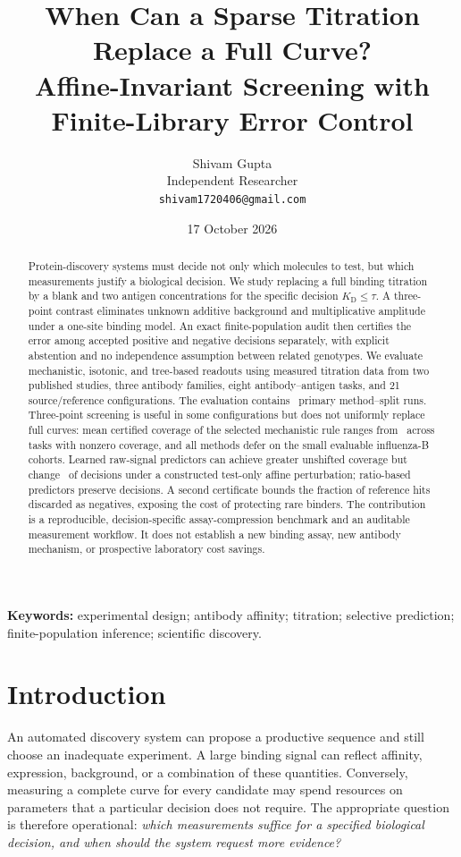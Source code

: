 \documentclass[11pt,letterpaper]{article}
\title{When Can a Sparse Titration Replace a Full Curve?\\[4pt]\large Affine-Invariant Screening with Finite-Library Error Control}
\author{Shivam Gupta\\\small Independent Researcher\\\small\texttt{shivam1720406@gmail.com}}
\date{17 October 2026}
\newcommand{\KD}{K_{\mathrm D}}
\begin{document}
\maketitle
\begin{abstract}
Protein-discovery systems must decide not only which molecules to test, but which measurements justify a biological decision. We study replacing a full binding titration by a blank and two antigen concentrations for the specific decision $\KD\leq\tau$. A three-point contrast eliminates unknown additive background and multiplicative amplitude under a one-site binding model. An exact finite-population audit then certifies the error among accepted positive and negative decisions separately, with explicit abstention and no independence assumption between related genotypes. We evaluate mechanistic, isotonic, and tree-based readouts using measured titration data from two published studies, three antibody families, eight antibody--antigen tasks, and 21 source/reference configurations. The evaluation contains \PrimaryRuns\ primary method--split runs. Three-point screening is useful in some configurations but does not uniformly replace full curves: mean certified coverage of the selected mechanistic rule ranges from \ContrastCoverageRange\ across tasks with nonzero coverage, and all methods defer on the small evaluable influenza-B cohorts. Learned raw-signal predictors can achieve greater unshifted coverage but change \RawFlipRange\ of decisions under a constructed test-only affine perturbation; ratio-based predictors preserve decisions. A second certificate bounds the fraction of reference hits discarded as negatives, exposing the cost of protecting rare binders. The contribution is a reproducible, decision-specific assay-compression benchmark and an auditable measurement workflow. It does not establish a new binding assay, new antibody mechanism, or prospective laboratory cost savings.
\end{abstract}
\noindent\textbf{Keywords:} experimental design; antibody affinity; titration; selective prediction; finite-population inference; scientific discovery.

\section{Introduction}
An automated discovery system can propose a productive sequence and still choose an inadequate experiment. A large binding signal can reflect affinity, expression, background, or a combination of these quantities. Conversely, measuring a complete curve for every candidate may spend resources on parameters that a particular decision does not require. The appropriate question is therefore operational: \emph{which measurements suffice for a specified biological decision, and when should the system request more evidence?}
\end{document}
